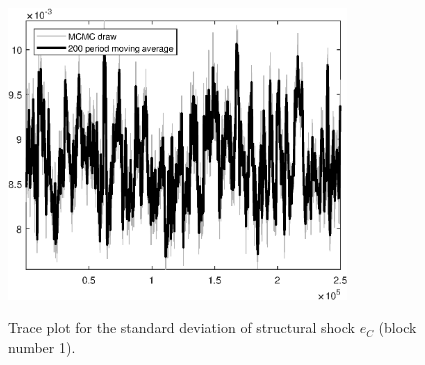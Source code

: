 \begin{figure}[H]
\centering
  \includegraphics[width=0.8\textwidth]{BRS_growth_ext_util/graphs/TracePlot_SE_e_C_blck_1}\\
    \caption{Trace plot for the standard deviation of structural shock ${e_C}$ (block number 1).}
\end{figure}
